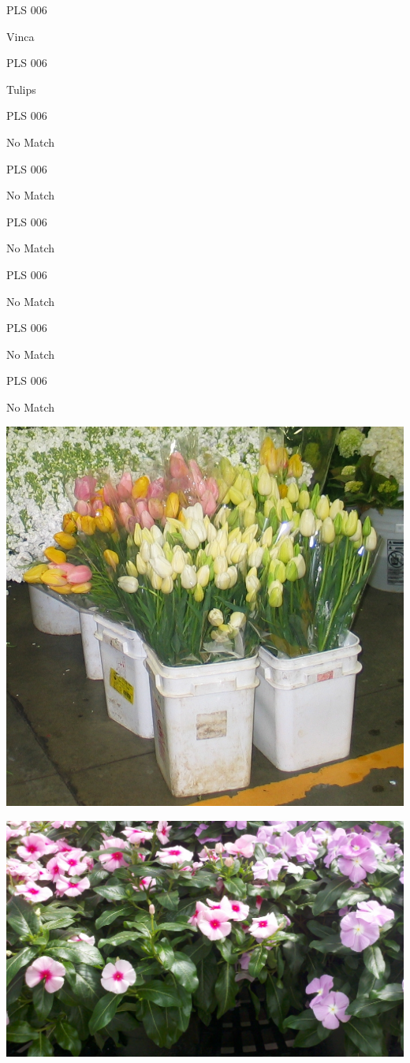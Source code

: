 \documentclass{article}
\begin{document}
\noindent  PLS 006
\vfill
\centerline{{\huge Vinca }}
\vfill
\newpage

\noindent  PLS 006
\vfill
\centerline{{\huge Tulips }}
\vfill
\newpage

\noindent  PLS 006
\vfill
\centerline{{\huge No Match }}
\vfill
\newpage

\noindent  PLS 006
\vfill
\centerline{{\huge No Match }}
\vfill
\newpage

\noindent  PLS 006
\vfill
\centerline{{\huge No Match }}
\vfill
\newpage

\noindent  PLS 006
\vfill
\centerline{{\huge No Match }}
\vfill
\newpage

\noindent  PLS 006
\vfill
\centerline{{\huge No Match }}
\vfill
\newpage

\noindent  PLS 006
\vfill
\centerline{{\huge No Match }}
\vfill
\newpage

\begin{center}
\includegraphics[height=0.925\paperheight]{../Tulips.jpg}
\end{center}
\newpage

\begin{center}
\includegraphics[height=0.925\paperheight]{../Vinca.jpg}
\end{center}
\newpage
\end{document}
